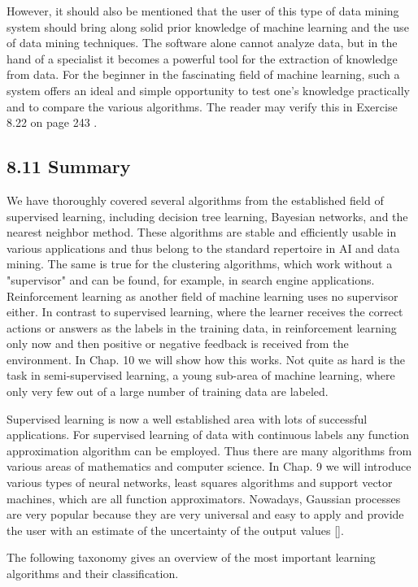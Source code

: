 \documentclass[10pt]{article}
\begin{document}
However, it should also be mentioned that the user of this type of data mining system should bring along solid prior knowledge of machine learning and the use of data mining techniques. The software alone cannot analyze data, but in the hand of a specialist it becomes a powerful tool for the extraction of knowledge from data. For the beginner in the fascinating field of machine learning, such a system offers an ideal and simple opportunity to test one's knowledge practically and to compare the various algorithms. The reader may verify this in Exercise 8.22 on page 243 .

\subsection*{8.11 Summary}
We have thoroughly covered several algorithms from the established field of supervised learning, including decision tree learning, Bayesian networks, and the nearest neighbor method. These algorithms are stable and efficiently usable in various applications and thus belong to the standard repertoire in AI and data mining. The same is true for the clustering algorithms, which work without a "supervisor" and can be found, for example, in search engine applications. Reinforcement learning as another field of machine learning uses no supervisor either. In contrast to supervised learning, where the learner receives the correct actions or answers as the labels in the training data, in reinforcement learning only now and then positive or negative feedback is received from the environment. In Chap. 10 we will show how this works. Not quite as hard is the task in semi-supervised learning, a young sub-area of machine learning, where only very few out of a large number of training data are labeled.

Supervised learning is now a well established area with lots of successful applications. For supervised learning of data with continuous labels any function approximation algorithm can be employed. Thus there are many algorithms from various areas of mathematics and computer science. In Chap. 9 we will introduce various types of neural networks, least squares algorithms and support vector machines, which are all function approximators. Nowadays, Gaussian processes are very popular because they are very universal and easy to apply and provide the user with an estimate of the uncertainty of the output values [\cite{rasmussen2006gpml}].

The following taxonomy gives an overview of the most important learning algorithms and their classification.\\
\end{document}
